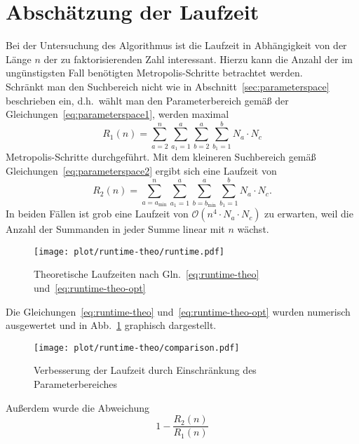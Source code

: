\section{Abschätzung der Laufzeit}\label{sec:runtime-theo}
Bei der Untersuchung des Algorithmus ist die Laufzeit in Abhängigkeit von der Länge $n$ der zu faktorisierenden Zahl interessant. Hierzu kann die Anzahl der im ungünstigsten Fall benötigten Metropolis-Schritte betrachtet werden. \\
Schränkt man den Suchbereich nicht wie in Abschnitt~\ref{sec:parameterspace} beschrieben ein, d.h.\ wählt man den Parameterbereich gemäß der Gleichungen~\eqref{eq:parameterspace1}, werden maximal
\begin{equation}
		R_1\left(n\right)=\sum\limits_{a=2}^{n}\sum\limits_{a_1=1}^{a}\sum\limits_{b=2}^{a}\sum\limits_{b_1=1}^{b}N_a\cdot N_c\label{eq:runtime-theo}
\end{equation}
Metropolis-Schritte durchgeführt. Mit dem kleineren Suchbereich gemäß Gleichungen~\eqref{eq:parameterspace2} ergibt sich eine Laufzeit von
\begin{equation}
		R_2\left(n\right)=\sum\limits_{a=a_\mathrm{\min}}^{n}\sum\limits_{a_1=1}^{a}\sum\limits_{b=b_\mathrm{\min}}^{a}\sum\limits_{b_1=1}^{b}N_a\cdot N_c\label{eq:runtime-theo-opt}.
\end{equation}
In beiden Fällen ist grob eine Laufzeit von $\mathcal{O}\left(n^4\cdot N_a\cdot N_c\right)$ zu erwarten, weil die Anzahl der Summanden in jeder Summe linear mit $n$ wächst. \\
\begin{figure}[h!]
		\centering
		\texttt{[image: plot/runtime-theo/runtime.pdf]}
		\caption{Theoretische Laufzeiten nach Gln.~\eqref{eq:runtime-theo} und~\eqref{eq:runtime-theo-opt}}\label{fig:runtime-theo}
\end{figure}
Die Gleichungen~\eqref{eq:runtime-theo} und~\eqref{eq:runtime-theo-opt} wurden numerisch ausgewertet und in Abb.~\ref{fig:runtime-theo} graphisch dargestellt.\\
\begin{figure}[h!]
		\centering
		\texttt{[image: plot/runtime-theo/comparison.pdf]}
		\caption{Verbesserung der Laufzeit durch Einschränkung des Parameterbereiches}\label{fig:runtime-theo-comparison}
\end{figure}
Außerdem wurde die Abweichung
\begin{equation*}
		1-\frac{R_2\left(n\right)}{R_1\left(n\right)}
\end{equation*}
